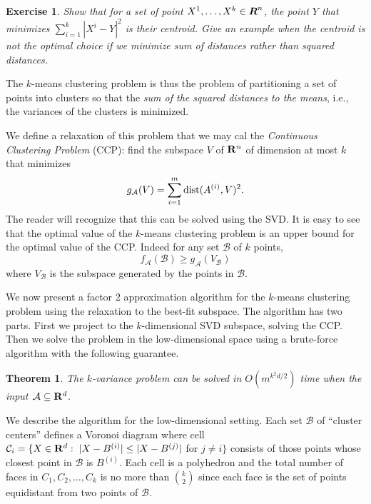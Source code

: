 \documentclass{book}
\newtheorem{theorem}{Theorem}[chapter]
\newtheorem{exercise}{Exercise}
\numberwithin{exercise}{chapter}
\begin{document}
\begin{exercise}
Show that for a set of point $X^1, \ldots, X^k \in \mbox{\mbox{\boldmath $R$}}^n$, the point $Y$ that
minimizes $\sum_{i=1}^k |X^i - Y|^2$ is their centroid. Give an example when the centroid is not the optimal choice if we minimize sum of distances rather than squared distances.
\end{exercise}

The $k$-means clustering
problem is thus the problem of partitioning a set of points into clusters
so that the {\em sum of the squared distances to the means}, i.e., the variances of the clusters is minimized.

We define a relaxation of this problem that we may cal the {\em Continuous Clustering Problem} (CCP): find the subspace $V$ of ${\bf R}^n$
of dimension at most $k$ that minimizes
$$g_{{\mathcal A}}(V) = \sum_{i=1}^m \hbox{dist} (A^{(i)},V)^2.$$
The reader will recognize that this can be solved using the SVD.
It is easy to see that the optimal value of the $k$-means clustering problem
 is an upper bound for
the optimal value of the CCP. Indeed for any set ${\mathcal B}$ of $k$ points,
\begin{equation}\label{100}
f_{{\mathcal A}}({\mathcal B})\geq g_{{\mathcal A}}(V_{{\mathcal B}})
\end{equation}
where $V_{{\mathcal B}}$ is the subspace generated by the points in ${\mathcal B}$.

We now present a factor $2$
approximation algorithm for the $k$-means clustering problem
using the relaxation to the best-fit subspace. The algorithm has two parts. First we project to the $k$-dimensional SVD subspace, solving the CCP. Then we solve the problem in the low-dimensional space using a brute-force algorithm with the following guarantee.

\begin{theorem}
The $k$-variance problem can be solved
in $O(m^{k^2d/2})$ time when the input
${\mathcal A}\subseteq {\bf R}^d$.
\end{theorem}

We describe the algorithm for the low-dimensional setting.
Each set ${\mathcal B}$ of ``cluster centers'' defines a Voronoi diagram where cell
${\mathcal C}_i=\{X\in {\bf R}^d:\;|X-B^{(i)}|\leq |X-B^{(j)}|$ for $j\neq i\}$ consists of those points
whose closest point in ${\mathcal B}$ is $B^{(i)}$. Each cell is a polyhedron and the total number of faces in
$C_1,C_2,\ldots,C_k$ is no more than $\binom{k}{2}$ since each face is the set of points equidistant from
two points of ${\mathcal B}$.
\end{document}
